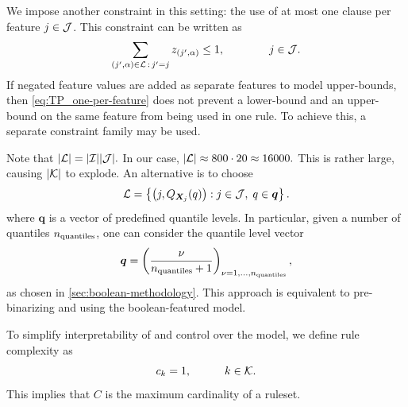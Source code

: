 We impose another constraint in this setting: the use of at most one clause per feature $j \in \mathcal{J}$.
This constraint can be written as
\begin{equation}
    \sum_{(j',\alpha) \in \mathcal{L} \,:\, j' = j} z_{(j', \alpha)} \leq 1, \quad \quad \quad \quad j \in \mathcal{J}. \label{eq:TP_one-per-feature}
\end{equation}
If negated feature values are added as separate features to model upper-bounds,
then \eqref{eq:TP_one-per-feature} does not prevent a lower-bound and an upper-bound on the same feature from being used in one rule.
To achieve this, a separate constraint family may be used.

Note that $|\mathcal{L}| = |\mathcal{I}||\mathcal{J}|.$ In our case, $|\mathcal{L}| \approx 800 \cdot 20 \approx 16 000.$
This is rather large, causing $|\mathcal{K}|$ to explode.
An alternative is to choose
\begin{equation}\label{eq:threshold_L_quantile}
    \mathcal{L} = \left\{ \left(j, Q_{\bm{X}_j}(q)\right) : j \in \mathcal{J}, \; q \in \bm{q} \right\}.
\end{equation}
where $\bm{q}$ is a vector of predefined quantile levels.
In particular, given a number of quantiles $n_{\text{quantiles}}$, one can consider the quantile level vector
\[ \bm{q} = \left(\frac{\nu}{n_{\text{quantiles}} + 1}\right)_{\nu = 1,\dots,n_{\text{quantiles}}},\]
as chosen in \autoref{sec:boolean-methodology}.
This approach is equivalent to pre-binarizing and using the boolean-featured model.

To simplify interpretability of and control over the model, we define rule complexity as
\[c_k = 1, \quad \quad \quad k \in \mathcal{K}.\]
This implies that $C$ is the maximum cardinality of a ruleset.